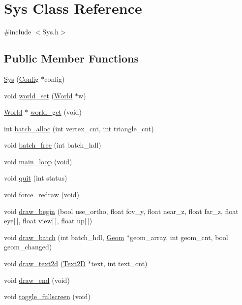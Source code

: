 \hypertarget{classSys}{}\section{Sys Class Reference}
\label{classSys}


{\ttfamily \#include $<$Sys.\+h$>$}

\subsection*{Public Member Functions}
\begin{DoxyCompactItemize}
\item 
\mbox{\hyperlink{classSys_a74c59dd28249cf0968407b3d4f90ccab}{Sys}} (\mbox{\hyperlink{classConfig}{Config}} $\ast$config)
\item 
void \mbox{\hyperlink{classSys_ad3ee3df03087abf9cc5d15a57e0ab0a2}{world\+\_\+set}} (\mbox{\hyperlink{classWorld}{World}} $\ast$w)
\item 
\mbox{\hyperlink{classWorld}{World}} $\ast$ \mbox{\hyperlink{classSys_aee0559155f152be16fd2b42fe13635f0}{world\+\_\+get}} (void)
\item 
int \mbox{\hyperlink{classSys_adc7a52fbbbb571b6588907ddc34ccdee}{batch\+\_\+alloc}} (int vertex\+\_\+cnt, int triangle\+\_\+cnt)
\item 
void \mbox{\hyperlink{classSys_a975e9e5bdbe0a8d0d091cc5e8045aa5f}{batch\+\_\+free}} (int batch\+\_\+hdl)
\item 
void \mbox{\hyperlink{classSys_a6e1bbe5eb1151dca4b61ac6bc43a00fe}{main\+\_\+loop}} (void)
\item 
void \mbox{\hyperlink{classSys_a6afadb6bbb36da0d0fa9ca0f678f7dcb}{quit}} (int status)
\item 
void \mbox{\hyperlink{classSys_a2115dba550f339c2faa9585faefd8488}{force\+\_\+redraw}} (void)
\item 
void \mbox{\hyperlink{classSys_aa9df1a08f130a88706e3f06faae56bb6}{draw\+\_\+begin}} (bool use\+\_\+ortho, float fov\+\_\+y, float near\+\_\+z, float far\+\_\+z, float eye\mbox{[}$\,$\mbox{]}, float view\mbox{[}$\,$\mbox{]}, float up\mbox{[}$\,$\mbox{]})
\item 
void \mbox{\hyperlink{classSys_aa6238558baf8cc9cd33b6e64e4692bc1}{draw\+\_\+batch}} (int batch\+\_\+hdl, \mbox{\hyperlink{classGeom}{Geom}} $\ast$geom\+\_\+array, int geom\+\_\+cnt, bool geom\+\_\+changed)
\item 
void \mbox{\hyperlink{classSys_a48a44b17ef0cc797f52e66ff86b0b4ac}{draw\+\_\+text2d}} (\mbox{\hyperlink{classText2D}{Text2D}} $\ast$text, int text\+\_\+cnt)
\item 
void \mbox{\hyperlink{classSys_a9f9738ef3a861766c5450569de9f1671}{draw\+\_\+end}} (void)
\item 
void \mbox{\hyperlink{classSys_a2b0db92b30d906bea2600fc10b41de6c}{toggle\+\_\+fullscreen}} (void)
\end{DoxyCompactItemize}


